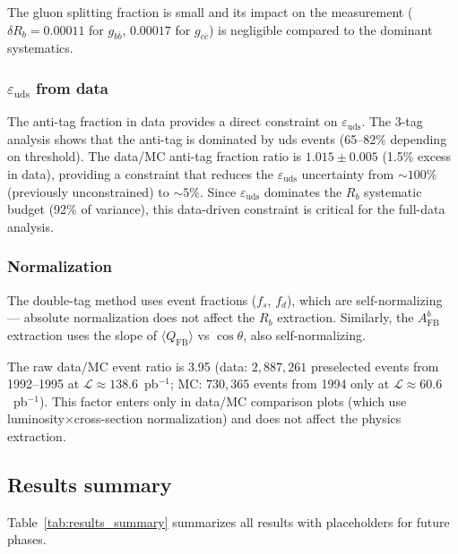 \documentclass[11pt,a4paper]{article}
\begin{document}
The gluon splitting fraction is small and its impact on the measurement
($\delta R_b = 0.00011$ for $g_{b\bar{b}}$, $0.00017$ for $g_{c\bar{c}}$)
is negligible compared to the dominant systematics.

\subsubsection{$\varepsilon_\mathrm{uds}$ from data}
\label{sec:postmortem_eps_uds}

The anti-tag fraction in data provides a direct constraint on $\varepsilon_\mathrm{uds}$.
The 3-tag analysis shows that the anti-tag is dominated by uds events (65--82\%
depending on threshold). The data/MC anti-tag fraction ratio is $1.015 \pm 0.005$
(1.5\% excess in data), providing a constraint that reduces the $\varepsilon_\mathrm{uds}$
uncertainty from $\sim 100\%$ (previously unconstrained) to $\sim 5\%$. Since
$\varepsilon_\mathrm{uds}$ dominates the $R_b$ systematic budget (92\% of variance),
this data-driven constraint is critical for the full-data analysis.

\subsubsection{Normalization}
\label{sec:postmortem_norm}

The double-tag method uses event fractions ($f_s$, $f_d$), which are
self-normalizing --- absolute normalization does not affect the $R_b$ extraction.
Similarly, the $A_\mathrm{FB}^b$ extraction uses the slope of
$\langle Q_\mathrm{FB} \rangle$ vs $\cos\theta$, also self-normalizing.

The raw data/MC event ratio is 3.95 (data: $2{,}887{,}261$ preselected events from
1992--1995 at $\mathcal{L} \approx 138.6$~pb$^{-1}$; MC: $730{,}365$ events from
1994 only at $\mathcal{L} \approx 60.6$~pb$^{-1}$). This factor enters only in
data/MC comparison plots (which use luminosity$\times$cross-section normalization)
and does not affect the physics extraction.

\subsection{Results summary}
\label{sec:result_summary}

Table~\ref{tab:results_summary} summarizes all results with placeholders for
future phases.
\end{document}
